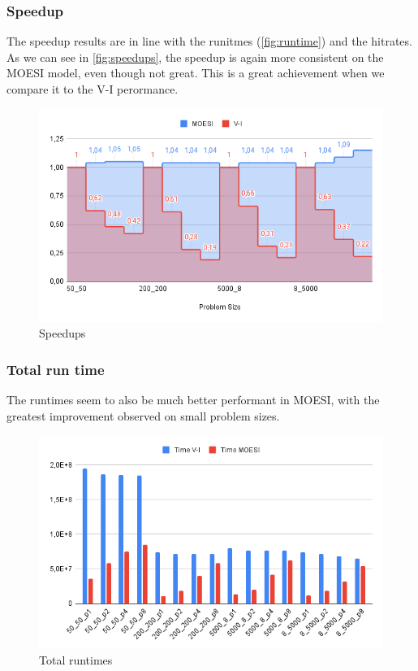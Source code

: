 \subsubsection{Speedup}
The speedup results are in line with the runitmes (\autoref{fig:runtime}) and the hitrates. As we can see in \autoref{fig:speedups}, the speedup is again more consistent on the MOESI model, even though not great. This is a great achievement when we compare it to the V-I perormance.
\begin{figure}[H]
    \centering
    \includegraphics[scale=0.4]{Figures/speedups.png}
    \caption{Speedups}
    \label{fig:speedups}
\end{figure}

\subsubsection{Total run time}
The runtimes seem to also be much better performant in MOESI, with the greatest improvement observed on small problem sizes.
\begin{figure}[H]
    \centering
    \includegraphics[scale=0.4]{Figures/time.png}
    \caption{Total runtimes}
    \label{fig:runtime}
\end{figure}


